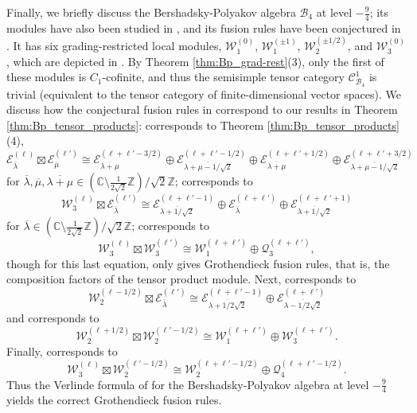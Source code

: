 \documentclass[11pt, reqno]{amsart}
\theoremstyle{definition}\newtheorem{defi}[thm]{Definition}
\theoremstyle{definition}\newtheorem{rem}[thm]{Remark}
\theoremstyle{definition}\newtheorem{exam}[thm]{Example}
\theoremstyle{definition}\newtheorem{assum}[thm]{Assumption}
\newcommand{\cB}{\mathcal{B}}
\newcommand{\cE}{\mathcal{E}}
\newcommand{\cC}{\mathcal{C}}
\newcommand{\cW}{\mathcal{W}}
\newcommand{\cQ}{\mathcal{Q}}
\newcommand{\CC}{\mathbb{C}}
\newcommand{\ZZ}{\mathbb{Z}}
\newcommand{\tens}{\boxtimes}
\begin{document}
Finally, we briefly discuss the Bershadsky-Polyakov algebra $\cB_4$ at level $-\frac{9}{4}$; its modules have also been studied in \cite[Section 6]{AK1}, and its fusion rules have been conjectured in \cite[Section 6.3]{FR}. It has six grading-restricted local modules, $\cW_1^{(0)}$, $\cW_1^{(\pm 1)}$, $\cW_2^{(\pm 1/2)}$, and $\cW_3^{(0)}$, which are depicted in \cite[Equation 6.43]{FR}. By Theorem \ref{thm:Bp_grad-rest}(3), only the first of these modules is $C_1$-cofinite, and thus the semisimple tensor category $\cC^1_{\cB_4}$ is trivial (equivalent to the tensor category of finite-dimensional vector spaces). We discuss how the conjectural fusion rules in \cite{FR} correspond to our results in Theorem \ref{thm:Bp_tensor_products}: \cite[Equation 6.48]{FR} corresponds to Theorem \ref{thm:Bp_tensor_products}(4),
\begin{equation*}
\cE_{\overline{\lambda}}^{(\ell)}\tens\cE_{\overline{\mu}}^{(\ell')}\cong \cE_{\overline{\lambda+\mu}}^{(\ell+\ell'-3/2)}\oplus\cE_{\overline{\lambda+\mu-1/\sqrt{2}}}^{(\ell+\ell'-1/2)}\oplus\cE_{\overline{\lambda+\mu}}^{(\ell+\ell'+1/2)}\oplus\cE_{\overline{\lambda+\mu-1/\sqrt{2}}}^{(\ell+\ell'+3/2)}
\end{equation*}
for $\overline{\lambda},\overline{\mu},\overline{\lambda+\mu}\in(\CC\setminus\frac{1}{2\sqrt{2}}\ZZ)/\sqrt{2}\ZZ$; \cite[Equation 6.49]{FR} corresponds to
\begin{equation*}
\cW_3^{(\ell)}\tens\cE^{(\ell')}_{\overline{\lambda}} \cong\cE_{\overline{\lambda+1/\sqrt{2}}}^{(\ell+\ell'-1)}\oplus\cE_{\overline{\lambda}}^{(\ell+\ell')}\oplus\cE_{\overline{\lambda+1/\sqrt{2}}}^{(\ell+\ell'+1)}
\end{equation*}
for $\overline{\lambda}\in(\CC\setminus\frac{1}{2\sqrt{2}}\ZZ)/\sqrt{2}\ZZ$; \cite[Equation 6.50]{FR} corresponds to
\begin{equation*}
\cW_3^{(\ell)}\tens\cW^{(\ell')}_3\cong \cW_1^{(\ell+\ell')}\oplus\cQ_3^{(\ell+\ell')},
\end{equation*}
though for this last equation, \cite{FR} only gives Grothendieck fusion rules, that is, the composition factors of the tensor product module. Next, \cite[Equation 6.52]{FR} corresponds to
\begin{equation*}
\cW_2^{(\ell-1/2)}\tens\cE_{\overline{\lambda}}^{(\ell')}\cong\cE_{\overline{\lambda+1/2\sqrt{2}}}^{(\ell+\ell'-1)}\oplus\cE_{\overline{\lambda-1/2\sqrt{2}}}^{(\ell+\ell')}
\end{equation*}
and \cite[Equation 6.53]{FR} corresponds to
\begin{equation*}
\cW_2^{(\ell+1/2)}\tens\cW_2^{(\ell'-1/2)}\cong \cW_1^{(\ell+\ell')}\oplus \cW_3^{(\ell+\ell')}.
\end{equation*}
Finally, \cite[Equation 6.54]{FR} corresponds to
\begin{equation*}
\cW_3^{(\ell)}\tens\cW_2^{(\ell'-1/2)}\cong\cW_2^{(\ell+\ell'-1/2)}\oplus\cQ_4^{(\ell+\ell'-1/2)}.
\end{equation*}
Thus the Verlinde formula of \cite{FR} for the Bershadsky-Polyakov algebra at level $-\frac{9}{4}$ yields the correct Grothendieck fusion rules.
\end{document}
